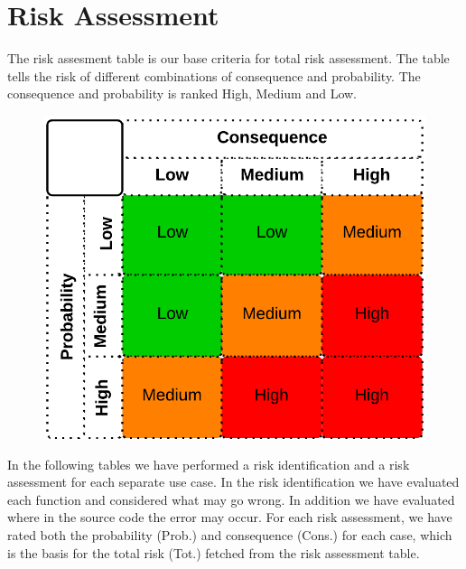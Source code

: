 \chapter{Risk Assessment}

	The risk assesment table is our base criteria for total risk assessment. The table tells 
	the risk of different combinations of consequence and probability. The consequence and 
	probability is ranked High, Medium and Low. 

		\begin{figure}[H]
			\includegraphics[scale=0.3]{pics/risk.png}
		\end{figure}

	In the following tables we have performed a risk identification and a risk assessment for 
	each separate use case. In the risk identification we have evaluated each function and 
	considered what may go wrong. In addition we have evaluated where in the source code the 
	error may occur. For each risk assessment, we have rated both the probability (Prob.) and consequence (Cons.) for each case, which is the basis for the total risk (Tot.) fetched from the risk assessment table.

	\clearpage


